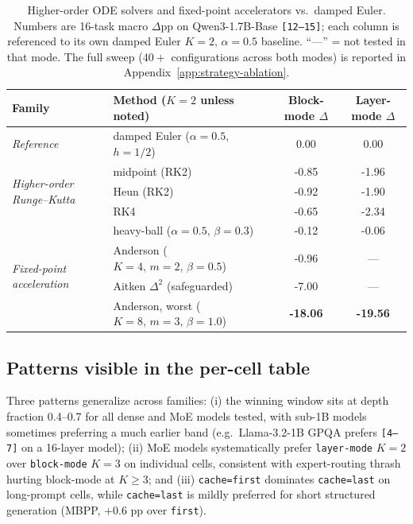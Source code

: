 \begin{table}[h]
\centering
\caption{Higher-order ODE solvers and fixed-point accelerators vs.\ damped Euler. Numbers are 16-task macro $\Delta$pp on Qwen3-1.7B-Base \texttt{[12--15]}; each column is referenced to its own damped Euler $K{=}2,\,\alpha{=}0.5$ baseline. ``---'' = not tested in that mode. The full sweep ($40+$ configurations across both modes) is reported in Appendix~\ref{app:strategy-ablation}.}
\label{tab:solver-ablation}
\small
\setlength{\tabcolsep}{8pt}
\renewcommand{\arraystretch}{1.12}
\begin{tabular*}{\textwidth}{@{\extracolsep{\fill}}llcc@{}}
\toprule
Family & Method ($K{=}2$ unless noted) & Block-mode $\Delta$ & Layer-mode $\Delta$ \\
\midrule
\textit{Reference}
   & damped Euler ($\alpha{=}0.5$, $h{=}1/2$)
   & 0.00 & 0.00 \\
\midrule
\multirow{3}{*}{\textit{Higher-order Runge--Kutta}}
   & midpoint (RK2) & -0.85 & -1.96 \\
   & Heun (RK2)     & -0.92 & -1.90 \\
   & RK4            & -0.65 & -2.34 \\
\midrule
\multirow{4}{*}{\textit{Fixed-point acceleration}}
   & heavy-ball ($\alpha{=}0.5,\,\beta{=}0.3$)
       & -0.12 & -0.06 \\
   & Anderson ($K{=}4,\,m{=}2,\,\beta{=}0.5$)
       & -0.96 & ---      \\
   & Aitken $\Delta^2$ (safeguarded)
       & -7.00 & ---      \\
   & Anderson, worst ($K{=}8,\,m{=}3,\,\beta{=}1.0$)
       & \textbf{-18.06} & \textbf{-19.56} \\
\bottomrule
\end{tabular*}
\end{table}

\subsection{Patterns visible in the per-cell table}

Three patterns generalize across families: (i) the winning window sits at depth fraction 0.4--0.7 for all dense and MoE models tested, with sub-1B models sometimes preferring a much earlier band (e.g.\ Llama-3.2-1B GPQA prefers \texttt{[4--7]} on a 16-layer model); (ii) MoE models systematically prefer \texttt{layer-mode} $K{=}2$ over \texttt{block-mode} $K{=}3$ on individual cells, consistent with expert-routing thrash hurting block-mode at $K \geq 3$; and (iii) \texttt{cache=first} dominates \texttt{cache=last} on long-prompt cells, while \texttt{cache=last} is mildly preferred for short structured generation (MBPP, +0.6 pp over \texttt{first}).


